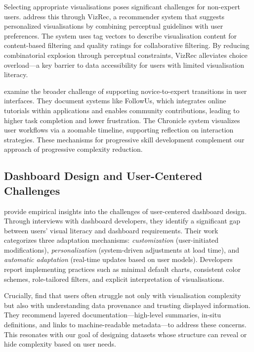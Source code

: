 \documentclass[12pt,a4paper]{article}
\begin{document}
Selecting appropriate visualisations poses significant challenges for non-expert users. \citet{mutlu2016vizrec} address this through VizRec, a recommender system that suggests personalized visualisations by combining perceptual guidelines with user preferences. The system uses tag vectors to describe visualisation content for content-based filtering and quality ratings for collaborative filtering. By reducing combinatorial explosion through perceptual constraints, VizRec alleviates choice overload---a key barrier to data accessibility for users with limited visualisation literacy.

\vspace{1em}

\noindent \citet{cockburn2014supportingnoviceto} examine the broader challenge of supporting novice-to-expert transitions in user interfaces. They document systems like FollowUs, which integrates online tutorials within applications and enables community contributions, leading to higher task completion and lower frustration. The Chronicle system visualizes user workflows via a zoomable timeline, supporting reflection on interaction strategies. These mechanisms for progressive skill development complement our approach of progressive complexity reduction.

\subsection{Dashboard Design and User-Centered Challenges}

\noindent \citet{alhamadi2022dataqualitymismatched} provide empirical insights into the challenges of user-centered dashboard design. Through interviews with dashboard developers, they identify a significant gap between users' visual literacy and dashboard requirements. Their work categorizes three adaptation mechanisms: \textit{customization} (user-initiated modifications), \textit{personalization} (system-driven adjustments at load time), and \textit{automatic adaptation} (real-time updates based on user models). Developers report implementing practices such as minimal default charts, consistent color schemes, role-tailored filters, and explicit interpretation of visualisations.

\vspace{1em}

\noindent Crucially, \citeauthor{alhamadi2022dataqualitymismatched} find that users often struggle not only with visualisation complexity but also with understanding data provenance and trusting displayed information. They recommend layered documentation---high-level summaries, in-situ definitions, and links to machine-readable metadata---to address these concerns. This resonates with our goal of designing datasets whose structure can reveal or hide complexity based on user needs.
\end{document}
